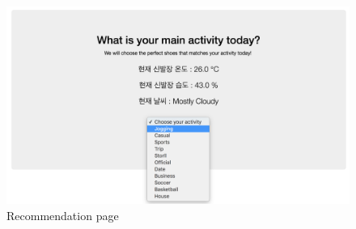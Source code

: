 \documentclass[conference]{IEEEtran}
\begin{document}
\begin{figure}[H]
\begin{center}
    \includegraphics[scale=0.25]{capture6}
    \caption{Recommendation page} \label{fig:label}
\end{center}
\end{figure}
\end{document}
